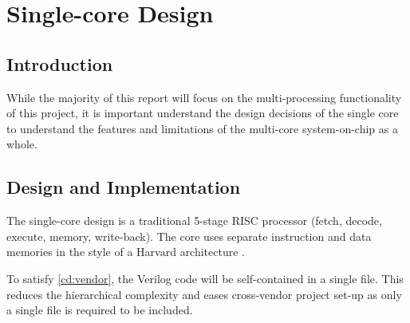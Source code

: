 
\chapter{Single-core Design}
\label{sec:singlecore}
\startcontents[chapters]

\section{Introduction}
While the majority of this report will focus on the multi-processing functionality of this project, it is important understand the design decisions of the single core to understand the features and limitations of the multi-core system-on-chip as a whole.

\section{Design and Implementation}
The single-core design is a traditional 5-stage RISC processor (fetch, decode, execute, memory, write-back). The core uses separate instruction and data memories in the style of a Harvard architecture \cite{harvard}.

To satisfy \ref{cd:vendor}, the Verilog code will be self-contained in a single file. This reduces the hierarchical complexity and eases cross-vendor project set-up as only a single file is required to be included. 

